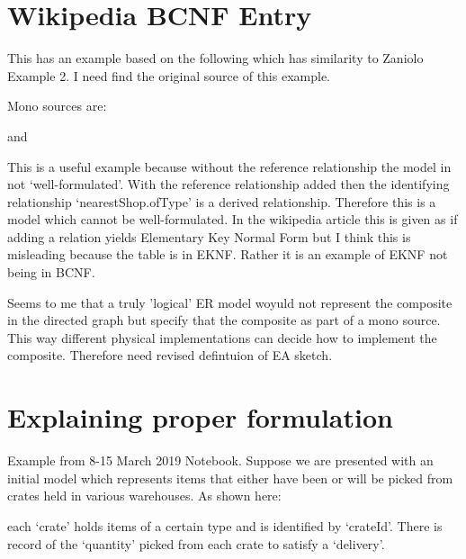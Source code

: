 \documentclass[10pt,a4paper]{scrartcl}
\renewcommand{\erpictureFolder}[0]{../SharedPictures}
\begin{document}
\section{Wikipedia BCNF Entry}
This has an example based on the following which has similarity to Zaniolo Example 2.
I need find the original source of this example.
\begin{center}

\end{center}
Mono sources are:
\newcommand{\attr}[1]{#1}
\renewcommand{\attr}[1]{\psframebox[linecolor=red,framearc=.1]{#1}}
\newcommand{\attrtype}[1]{#1}
\renewcommand{\attrtype}[1]{\psframebox[linecolor=blue,framearc=.1]{#1}}
\newcommand{\etype}[1]{#1}
\renewcommand{\etype}[1]{\psframebox[linecolor=red,framearc=.1]{#1}}
\begin{center}

\end{center}
and

\begin{center}

\end{center}

This is a useful example because without the reference relationship the model in not `well-formulated'. With the reference relationship added
then the identifying relationship `nearestShop.ofType' is a derived relationship. Therefore this is a model which cannot be well-formulated.
In the wikipedia article this is given as if adding a relation yields Elementary Key Normal Form but I think this is misleading because 
the table is in EKNF. Rather it is an example of EKNF not being in BCNF.

Seems to me that a truly 'logical' ER model woyuld not represent the composite in the directed graph but specify that the composite as part of a mono source. This way different physical implementations can decide how to implement the composite. Therefore need revised defintuion of EA sketch.




\section{Explaining proper formulation}
Example from 8-15 March 2019 Notebook.
Suppose we are presented with an  initial model which represents items that either have been or will be picked from crates held in various warehouses.
As shown here:
\begin{center}

\end{center}
each `crate' holds items of a certain type and is identified by `crateId'. There is record of 
the `quantity' picked from each crate to satisfy a `delivery'.  
\end{document}
